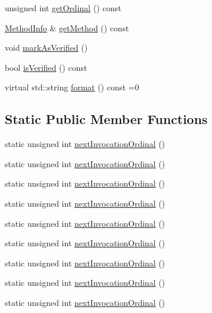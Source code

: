 \begin{DoxyCompactItemize}
\item 
unsigned int \mbox{\hyperlink{structfakeit_1_1Invocation_a86b6f74924a9fed6b8760c2ba86a249b}{get\+Ordinal}} () const
\item 
\mbox{\hyperlink{structfakeit_1_1MethodInfo}{Method\+Info}} \& \mbox{\hyperlink{structfakeit_1_1Invocation_ae0b909794e14d6bba7db6baaef471865}{get\+Method}} () const
\item 
void \mbox{\hyperlink{structfakeit_1_1Invocation_a4579628568d7b469a1d225b3d43822e5}{mark\+As\+Verified}} ()
\item 
bool \mbox{\hyperlink{structfakeit_1_1Invocation_ae1c4e0840951bd5be209fd02196ecc59}{is\+Verified}} () const
\item 
virtual std\+::string \mbox{\hyperlink{structfakeit_1_1Invocation_ad6bf5d7b6ae2897c5d6bbb51183b8c1d}{format}} () const =0
\end{DoxyCompactItemize}
\subsection*{Static Public Member Functions}
\begin{DoxyCompactItemize}
\item 
static unsigned int \mbox{\hyperlink{structfakeit_1_1Invocation_a98dae22c474686e75d95ff5aebef7ef8}{next\+Invocation\+Ordinal}} ()
\item 
static unsigned int \mbox{\hyperlink{structfakeit_1_1Invocation_a98dae22c474686e75d95ff5aebef7ef8}{next\+Invocation\+Ordinal}} ()
\item 
static unsigned int \mbox{\hyperlink{structfakeit_1_1Invocation_a98dae22c474686e75d95ff5aebef7ef8}{next\+Invocation\+Ordinal}} ()
\item 
static unsigned int \mbox{\hyperlink{structfakeit_1_1Invocation_a98dae22c474686e75d95ff5aebef7ef8}{next\+Invocation\+Ordinal}} ()
\item 
static unsigned int \mbox{\hyperlink{structfakeit_1_1Invocation_a98dae22c474686e75d95ff5aebef7ef8}{next\+Invocation\+Ordinal}} ()
\item 
static unsigned int \mbox{\hyperlink{structfakeit_1_1Invocation_a98dae22c474686e75d95ff5aebef7ef8}{next\+Invocation\+Ordinal}} ()
\item 
static unsigned int \mbox{\hyperlink{structfakeit_1_1Invocation_a98dae22c474686e75d95ff5aebef7ef8}{next\+Invocation\+Ordinal}} ()
\item 
static unsigned int \mbox{\hyperlink{structfakeit_1_1Invocation_a98dae22c474686e75d95ff5aebef7ef8}{next\+Invocation\+Ordinal}} ()
\item 
static unsigned int \mbox{\hyperlink{structfakeit_1_1Invocation_a98dae22c474686e75d95ff5aebef7ef8}{next\+Invocation\+Ordinal}} ()
\end{DoxyCompactItemize}



